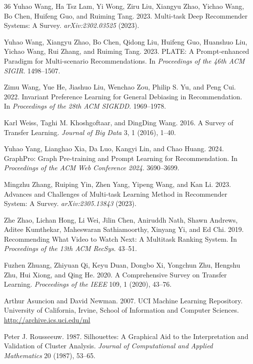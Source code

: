 \documentclass[review,anonymous]{acmart}
\begin{document}
\begin{thebibliography}{36}
Yuhao Wang, Ha Tsz Lam, Yi Wong, Ziru Liu, Xiangyu Zhao, Yichao Wang, Bo Chen,
Huifeng Guo, and Ruiming Tang. 2023. Multi-task Deep Recommender Systems: A
Survey. \emph{arXiv:2302.03525} (2023).

Yuhao Wang, Xiangyu Zhao, Bo Chen, Qidong Liu, Huifeng Guo, Huanshuo Liu,
Yichao Wang, Rui Zhang, and Ruiming Tang. 2023. PLATE: A Prompt-enhanced
Paradigm for Multi-scenario Recommendations.
In \emph{Proceedings of the 46th ACM SIGIR}. 1498--1507.

Zimu Wang, Yue He, Jiashuo Liu, Wenchao Zou, Philip S. Yu, and Peng Cui. 2022.
Invariant Preference Learning for General Debiasing in Recommendation.
In \emph{Proceedings of the 28th ACM SIGKDD}. 1969--1978.

Karl Weiss, Taghi M. Khoshgoftaar, and DingDing Wang. 2016. A Survey of Transfer
Learning. \emph{Journal of Big Data} 3, 1 (2016), 1--40.

Yuhao Yang, Lianghao Xia, Da Luo, Kangyi Lin, and Chao Huang. 2024. GraphPro:
Graph Pre-training and Prompt Learning for Recommendation.
In \emph{Proceedings of the ACM Web Conference 2024}. 3690--3699.

Mingzhu Zhang, Ruiping Yin, Zhen Yang, Yipeng Wang, and Kan Li. 2023. Advances
and Challenges of Multi-task Learning Method in Recommender System: A Survey.
\emph{arXiv:2305.13843} (2023).

Zhe Zhao, Lichan Hong, Li Wei, Jilin Chen, Aniruddh Nath, Shawn Andrews,
Aditee Kumthekar, Maheswaran Sathiamoorthy, Xinyang Yi, and Ed Chi. 2019.
Recommending What Video to Watch Next: A Multitask Ranking System.
In \emph{Proceedings of the 13th ACM RecSys}. 43--51.

Fuzhen Zhuang, Zhiyuan Qi, Keyu Duan, Dongbo Xi, Yongchun Zhu, Hengshu Zhu,
Hui Xiong, and Qing He. 2020. A Comprehensive Survey on Transfer Learning.
\emph{Proceedings of the IEEE} 109, 1 (2020), 43--76.

Arthur Asuncion and David Newman. 2007. UCI Machine Learning Repository.
University of California, Irvine, School of Information and Computer Sciences.
\url{http://archive.ics.uci.edu/ml}

Peter J. Rousseeuw. 1987. Silhouettes: A Graphical Aid to the Interpretation and
Validation of Cluster Analysis. \emph{Journal of Computational and Applied
Mathematics} 20 (1987), 53--65.


\end{thebibliography}
\end{document}
